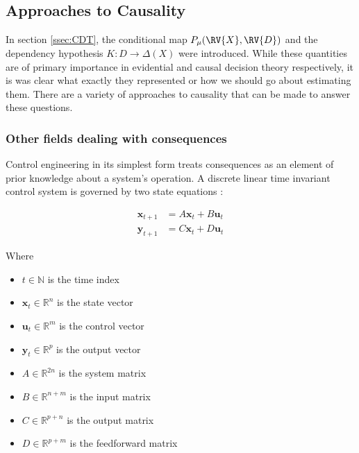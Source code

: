 
\subsection{Approaches to Causality}

In section \ref{ssec:CDT}, the conditional map $P_\mu(\RV{X},\RV{D})$ and the dependency hypothesis $K:D\to\Delta(X)$ were introduced. While these quantities are of primary importance in evidential and causal decision theory respectively, it is was clear what exactly they represented or how we should go about estimating them. There are a variety of approaches to causality that can be made to answer these questions. 

\subsubsection{Other fields dealing with consequences}


Control engineering in its simplest form treats consequences as an element of prior knowledge about a system's operation. A discrete linear time invariant control system is governed by two state equations \cite{ogata_discrete-time_1995,nise_control_2010}:

\begin{align}
    \mathbf{x}_{t+1} &= A\mathbf{x}_t + B\mathbf{u}_t\\
    \mathbf{y}_{t+1} &= C\mathbf{x}_t + D\mathbf{u}_t
\end{align}

Where 
\begin{itemize}
    \item $t\in \mathbb{N}$ is the time index
    \item $\mathbf{x}_t \in \mathbb{R}^n$ is the state vector
    \item $\mathbf{u}_t \in \mathbb{R}^m$ is the control vector
    \item $\mathbf{y}_t \in \mathbb{R}^p$ is the output vector
    \item $A\in \mathbb{R}^{2n}$ is the system matrix
    \item $B\in \mathbb{R}^{n+m}$ is the input matrix
    \item $C\in \mathbb{R}^{p+n}$ is the output matrix
    \item $D\in \mathbb{R}^{p+m}$ is the feedforward matrix
\end{itemize}

